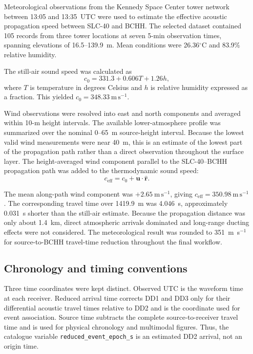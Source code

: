\documentclass[]{seismica}
\begin{document}
Meteorological observations from the Kennedy Space Center tower network between
13:05 and 13:35~UTC were used to estimate the effective acoustic propagation
speed between SLC-40 and BCHH. The selected dataset contained 105 records from
three tower locations at seven 5-min observation times, spanning elevations of
16.5--139.9~m. Mean conditions were 26.36$^\circ$C and 83.9\% relative
humidity.

The still-air sound speed was calculated as
\begin{equation}
  c_0 = 331.3 + 0.606T + 1.26h,
  \label{eq:sound_speed}
\end{equation}
where $T$ is temperature in degrees Celsius and $h$ is relative humidity
expressed as a fraction. This yielded
$c_0=348.33~\mathrm{m\,s^{-1}}$.

Wind observations were resolved into east and north components and averaged
within 10-m height intervals. The available lower-atmosphere profile was
summarized over the nominal 0--65~m source-height interval. Because the lowest
valid wind measurements were near 40~m, this is an estimate of the lowest part
of the propagation path rather than a direct observation throughout the
surface layer. The height-averaged wind component parallel to the
SLC-40--BCHH propagation path was added to the thermodynamic sound speed:
\begin{equation}
  c_{\mathrm{eff}} =
  c_0 + \mathbf{u}\cdot\hat{\mathbf{r}}.
  \label{eq:effective_speed}
\end{equation}

The mean along-path wind component was $+2.65~\mathrm{m\,s^{-1}}$, giving
$c_{\mathrm{eff}}=350.98~\mathrm{m\,s^{-1}}$. The corresponding travel time
over 1419.9~m was 4.046~s, approximately 0.031~s shorter than the still-air
estimate. Because the propagation distance was only about 1.4~km, direct
atmospheric arrivals dominated and long-range ducting effects were not
considered. The meteorological result was rounded to 351~m~s$^{-1}$ for
source-to-BCHH travel-time reduction throughout the final workflow.

\subsection{Chronology and timing conventions}
\label{sec:methods_chronology}

Three time coordinates were kept distinct. Observed UTC is the waveform time at
each receiver. Reduced arrival time corrects DD1 and DD3 only for their
differential acoustic travel times relative to DD2 and is the coordinate used
for event association. Source time subtracts the complete source-to-receiver
travel time and is used for physical chronology and multimodal figures. Thus,
the catalogue variable \texttt{reduced\_event\_epoch\_s} is an estimated DD2
arrival, not an origin time.
\end{document}
